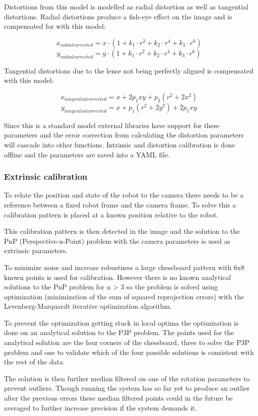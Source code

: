 Distortions from this model is modelled as radial distortion as well as tangential distortions. Radial distortions produce a fish-eye effect on the image and is compensated for with this model:

\[x_{radialcorrected} = x\cdot (1+k_1\cdot r^2 + k_2\cdot r^4 + k_3\cdot r^6)\]
\[y_{radialcorrected} = y\cdot (1+k_1\cdot r^2 + k_2\cdot r^4 + k_3\cdot r^6)\]

Tangential distortions due to the lense not being perfectly aligned is compensated with this model:

\[x_{tangentialcorrected} = x + 2p_1xy+p_2(r^2+2x^2)\]
\[y_{tangentialcorrected} = x + p_1(r^2+2y^2)+2p_1xy\]

Since this is a standard model external libraries have support for these parameters and the error correction from calculating the distortion parameters will cascade into other functions. Intrinsic and distortion calibration is done offline and the parameters are saved into a YAML file.

\subsubsection{Extrinsic calibration}
To relate the position and state of the robot to the camera there needs to be a reference between a fixed robot frame and the camera frame. To solve this a calibration pattern is placed at a known position relative to the robot.

This calibration pattern is then detected in the image and the solution to the PnP (Perspective-n-Point) problem with the camera parameters is used as extrinsic parameters.

To minimize noise and increase robustness a large chessboard pattern with 6x8 known points is used for calibration. However there is no known analytical solutions to the PnP problem for n > 3 so the problem is solved using optimization (minimization of the sum of squared reprojection errors) with the Levenberg-Marquardt iterative optimization algorithm.

To prevent the optimization getting stuck in local optima the optimization is done on an analytical solution to the P3P problem. The points used for the analytical solution are the four corners of the chessboard, three to solve the P3P problem and one to validate which of the four possible solutions is consistent with the rest of the data.

The solution is then further median filtered on one of the rotation parameters to prevent outliers. Though running the system has so far yet to produce an outlier after the previous errors these median filtered points could in the future be averaged to further increase precision if the system demands it.

